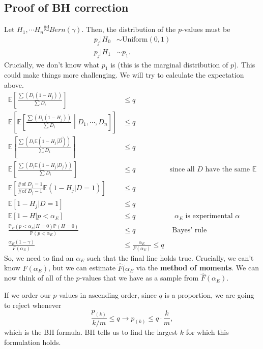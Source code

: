 \documentclass[titlepage, 12pt, leqno]{article}
\begin{document}
\subsection{Proof of BH correction}
Let $H_{1}, \cdots H_{n} \overset{\mathrm{iid}}{\sim}Bern(\gamma)$. Then, the
distribution of the $p$-values must be
\begin{align*}
    p_{j}|H_{0} &\sim \text{Uniform}(0,1) \\
    p_{j}|H_{1} &\sim p_{1}.
\end{align*}
Crucially, we don't know what $p_{1}$ is (this is the marginal distribution of
$p$). This could make things more challenging. We will try to calculate the
expectation above.
\begin{align*}
    \mathbb{E}\left[\frac{\sum (D_{i}(1-H_{j}))}{\sum D_{i}}\right] 
    &\le q \\
    \mathbb{E}\left[\mathbb{E}\left[\frac{\sum (D_{i}(1-H_{j}))}{\sum D_{i}}
        \middle|D_{1}, \cdots ,D_{n} \right]\right] 
    &\le q \\
    \mathbb{E}\left[\frac{\sum (D_{i}\mathbb{E}(1-H_j|\vec D))}{\sum D_{i}}
    \right]
    &\le q \\
    \mathbb{E}\left[\frac{\sum (D_{i}\mathbb{E}(1 - H_{j}|D_{j}))}{\sum D_{i}}
    \right]
    &\le q & \text{since all $D$ have the same $\mathbb{E}$} \\
    \mathbb{E}\left[\frac{ \text{\# of $D_{j} = 1$}}{ \text{\# of $D_{j}-1$}}
    \mathbb{E}(1 - H_{j}|D=1)\right]
    &\le q \\
    \mathbb{E}[1-H_{j}|D=1]
    &\le q \\
    \mathbb{E}[1-H|p<\alpha_{E}]
    &\le q & \text{ $\alpha_{E}$ is experimental $\alpha$}\\
    \frac{\mathbb{P}_{E}(p<\alpha_{E}|H=0)\mathbb{P}(H=0)}{\mathbb{P}(p<
    \alpha_{E})} 
    &\le q & \text{ Bayes' rule} \\
    \frac{\alpha_{E}(1 - \gamma)}{F(\alpha_{E})} 
    &\le \frac{\alpha_{E}}{F(\alpha_{E})} \le q
\end{align*}
So, we need to find an $\alpha_{E}$ such that the final line holds true. 
Crucially, we can't know $F(\alpha_{E})$, but we can estimate $\hat F(\alpha_{E}$
via the \textbf{method of moments}. We can now think of all of the $p$-values
that we have as a sample from $\hat F(\alpha_{E})$. 

If we order our $p$-values in ascending order, since $q$ is a proportion, we
are going to reject whenever 
\[
\frac{p_{(k)}}{k/m} \le q \rightarrow p_{(k)} \le q \cdot \frac{k}{m},
\]
which is the BH formula. BH tells us to find the largest $k$ for which this
formulation holds.
\end{document}
